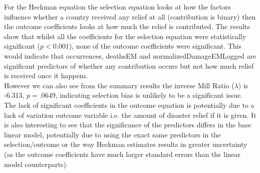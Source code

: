 \documentclass[12pt,letterpaper]{article}
\begin{document}
 
 For the Heckman equation the selection equation looks at how the factors influence whether a country received any relief at all (contribution is binary) then the outcome coefficients looks at how much the relief is contributed. The results show that whilst all the coefficients for the selection equation were statistically significant ($p<0.001$), none of the outcome coefficients were significant. This would indicate that occurrences, deathsEM and normalizedDamageEMLogged are significant predictors of whether any contribution occurs but not how much relief is received once it happens.  \\
 
 
However we can also see from the summary results the inverse Mill Ratio ($\lambda$) is -6.313, $p=.0649$, indicating  selection bias is unlikely to be a significant issue.  The lack of significant coefficients in the outcome equation is potentially due to a lack of variation outcome variable i.e. the amount of disaster relief if it is given. It is also interesting to see that the significance of the predictors differs in the base linear model, potentially due to using the exact same predictors in the selection/outcome or the way Heckman estimates results in greater uncertainty (as the outcome coefficients have much larger standard errors than the linear model counterparts).  \\
 
  
 
\end{document}
